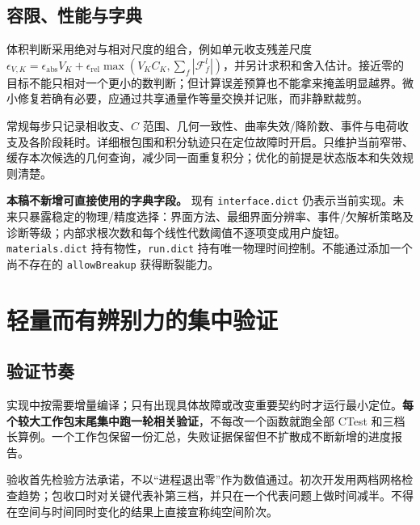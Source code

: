 \documentclass[11pt,a4paper]{article}
\newcommand{\code}[1]{{\small\nolinkurl{#1}}}
\begin{document}
\subsection{容限、性能与字典}
体积判断采用绝对与相对尺度的组合，例如单元收支残差尺度 $\epsilon_{V,K}=\epsilon_{\mathrm{abs}}V_K+\epsilon_{\mathrm{rel}}\max(V_KC_K,\sum_f|\mathcal F_f^l|)$，并另计求积和舍入估计。接近零的目标不能只相对一个更小的数判断；但计算误差预算也不能拿来掩盖明显越界。微小修复若确有必要，应通过共享通量作等量交换并记账，而非静默裁剪。

常规每步只记录相收支、$C$ 范围、几何一致性、曲率失效/降阶数、事件与电荷收支及各阶段耗时。详细根包围和积分轨迹只在定位故障时开启。只维护当前窄带、缓存本次候选的几何查询，减少同一面重复积分；优化的前提是状态版本和失效规则清楚。

\textbf{本稿不新增可直接使用的字典字段。} 现有 \code{interface.dict} 仍表示当前实现。未来只暴露稳定的物理/精度选择：界面方法、最细界面分辨率、事件/欠解析策略及诊断等级；内部求根次数和每个线性代数阈值不逐项变成用户旋钮。\code{materials.dict} 持有物性，\code{run.dict} 持有唯一物理时间控制。不能通过添加一个尚不存在的 \code{allowBreakup} 获得断裂能力。

\clearpage
\section{轻量而有辨别力的集中验证}
\subsection{验证节奏}
实现中按需要增量编译；只有出现具体故障或改变重要契约时才运行最小定位。\textbf{每个较大工作包末尾集中跑一轮相关验证}，不每改一个函数就跑全部 CTest 和三档长算例。一个工作包保留一份汇总，失败证据保留但不扩散成不断新增的进度报告。

验收首先检验方法承诺，不以“进程退出零”作为数值通过。初次开发用两档网格检查趋势；包收口时对关键代表补第三档，并只在一个代表问题上做时间减半。不得在空间与时间同时变化的结果上直接宣称纯空间阶次。
\end{document}
